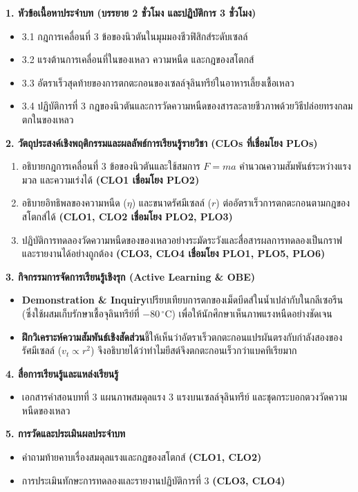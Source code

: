 \cleardoublepage
{}
\begin{planbox}
\noindent\textbf{1. หัวข้อเนื้อหาประจำบท (บรรยาย 2 ชั่วโมง และปฏิบัติการ 3 ชั่วโมง)}
\begin{itemize}
    \item 3.1 กฎการเคลื่อนที่ 3 ข้อของนิวตันในมุมมองชีวฟิสิกส์ระดับเซลล์
    \item 3.2 แรงต้านการเคลื่อนที่ในของเหลว ความหนืด และกฎของสโตกส์
    \item 3.3 อัตราเร็วสุดท้ายของการตกตะกอนของเซลล์จุลินทรีย์ในอาหารเลี้ยงเชื้อเหลว
    \item 3.4 ปฏิบัติการที่ 3 กฎของนิวตันและการวัดความหนืดของสารละลายชีวภาพด้วยวิธีปล่อยทรงกลมตกในของเหลว
\end{itemize}

\noindent\textbf{2. วัตถุประสงค์เชิงพฤติกรรมและผลลัพธ์การเรียนรู้รายวิชา (CLOs ที่เชื่อมโยง PLOs)}
\begin{enumerate}
    \item อธิบายกฎการเคลื่อนที่ 3 ข้อของนิวตันและใช้สมการ $F = ma$ คำนวณความสัมพันธ์ระหว่างแรง มวล และความเร่งได้ \textbf{(CLO1 เชื่อมโยง PLO2)}
    \item อธิบายอิทธิพลของความหนืด ($\eta$) และขนาดรัศมีเซลล์ ($r$) ต่ออัตราเร็วการตกตะกอนตามกฎของสโตกส์ได้ \textbf{(CLO1, CLO2 เชื่อมโยง PLO2, PLO3)}
    \item ปฏิบัติการทดลองวัดความหนืดของของเหลวอย่างระมัดระวังและสื่อสารผลการทดลองเป็นกราฟและรายงานได้อย่างถูกต้อง \textbf{(CLO3, CLO4 เชื่อมโยง PLO1, PLO5, PLO6)}
\end{enumerate}

\noindent\textbf{3. กิจกรรมการจัดการเรียนรู้เชิงรุก (Active Learning \& OBE)}
\begin{itemize}
    \item \textbf{Demonstration \& Inquiry}\quad เปรียบเทียบการตกของเม็ดบีดส์ในน้ำเปล่ากับในกลีเซอรีน (ซึ่งใช้ผสมเก็บรักษาเชื้อจุลินทรีย์ที่ $-80\,^\circ\text{C}$) เพื่อให้นักศึกษาเห็นภาพแรงหนืดอย่างชัดเจน
    \item \textbf{ฝึกวิเคราะห์ความสัมพันธ์เชิงสัดส่วน}\quad ชี้ให้เห็นว่าอัตราเร็วตกตะกอนแปรผันตรงกับกำลังสองของรัศมีเซลล์ ($v_t \propto r^2$) จึงอธิบายได้ว่าทำไมยีสต์จึงตกตะกอนเร็วกว่าแบคทีเรียมาก
\end{itemize}

\noindent\textbf{4. สื่อการเรียนรู้และแหล่งเรียนรู้}
\begin{itemize}
    \item เอกสารคำสอนบทที่ 3 แผนภาพสมดุลแรง 3 แรงบนเซลล์จุลินทรีย์ และชุดกระบอกตวงวัดความหนืดของเหลว
\end{itemize}

\noindent\textbf{5. การวัดและประเมินผลประจำบท}
\begin{itemize}
    \item คำถามท้ายคาบเรื่องสมดุลแรงและกฎของสโตกส์ \textbf{(CLO1, CLO2)}
    \item การประเมินทักษะการทดลองและรายงานปฏิบัติการที่ 3 \textbf{(CLO3, CLO4)}
\end{itemize}
\end{planbox}
\clearpage

